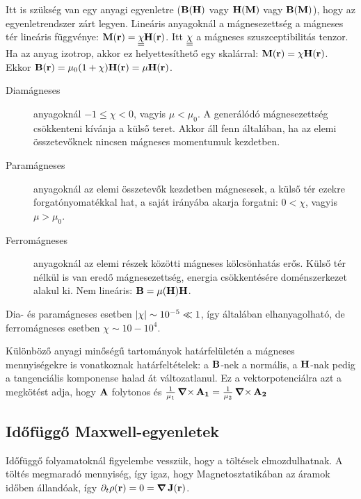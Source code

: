    Itt is szükség van egy anyagi egyenletre ($\mathbf{B}(\mathbf{H})$ vagy $\mathbf{H}(\mathbf{M})$ vagy $\mathbf{B}(\mathbf{M})$), hogy az egyenletrendszer zárt legyen. Lineáris anyagoknál a mágnesezettség a mágneses tér lineáris függvénye: $\mathbf{M}(\mathbf{r})=\underline{\underline{\chi}}\mathbf{H}(\mathbf{r})$. Itt $\underline{\underline{\chi}}$ a mágneses szuszceptibilitás tenzor. Ha az anyag izotrop, akkor ez helyettesíthető egy skalárral: $\mathbf{M}(\mathbf{r})=\chi\mathbf{H}(\mathbf{r})$. Ekkor $\mathbf{B}(\mathbf{r})=\mu_0(1+\chi)\mathbf{H}(\mathbf{r})=\mu\mathbf{H}(\mathbf{r})$. 
   
   \begin{description}
    \item[Diamágneses] anyagoknál $-1\leq\chi<0$, vagyis $\mu<\mu_0$. A generálódó mágnesezettség csökkenteni kívánja a külső teret. Akkor áll fenn általában, ha az elemi összetevőknek nincsen mágneses momentumuk kezdetben.
    \item[Paramágneses] anyagoknál az elemi összetevők kezdetben mágnesesek, a külső tér ezekre forgatónyomatékkal hat, a saját irányába akarja forgatni: $0<\chi$, vagyis $\mu>\mu_0$. 
    \item[Ferromágneses] anyagoknál az elemi részek közötti mágneses kölcsönhatás erős. Külső tér nélkül is van eredő mágnesezettség, energia csökkentésére doménszerkezet alakul ki. Nem lineáris: $\mathbf{B}=\mu(\mathbf{H})\mathbf{H}$. 
   \end{description}
   Dia- és paramágneses esetben $\left\lvert\chi\right\rvert\sim 10^{-5}\ll 1$, így általában elhanyagolható, de ferromágneses esetben $\chi\sim 10-10^{4}$. 
   
   Különböző anyagi minőségű tartományok határfelületén a mágneses mennyiségekre is vonatkoznak határfeltételek: a $\mathbf{B}$-nek a normális, a $\mathbf{H}$-nak pedig a tangenciális komponense halad át változatlanul. Ez a vektorpotenciálra azt a megkötést adja, hogy $\mathbf{A}$ folytonos és $\frac{1}{\mu_1}\mathop{\boldsymbol{\nabla}\times}\nolimits{\mathbf{A_1}}=\frac{1}{\mu_2}\mathop{\boldsymbol{\nabla}\times}\nolimits{\mathbf{A_2}}$

   
  \subsection{Időfüggő Maxwell-egyenletek}
   
   Időfüggő folyamatoknál figyelembe vesszük, hogy a töltések elmozdulhatnak. A töltés megmaradó mennyiség, így igaz, hogy 
   Magnetosztatikában az áramok időben állandóak, így $\partial_t\rho(\mathbf{r})=0=\mathop{\boldsymbol{\nabla}}\nolimits\mathbf{J}(\mathbf{r})$.
   
